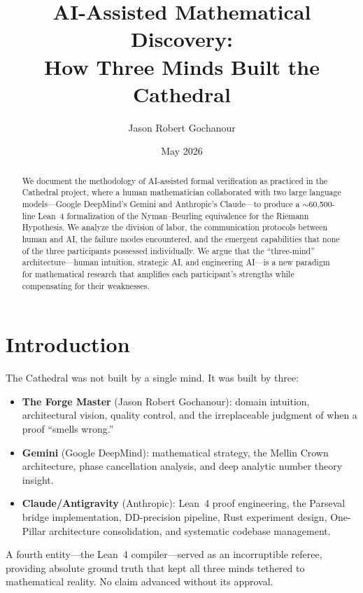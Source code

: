 \documentclass[11pt,a4paper]{article}
\title{%
  AI-Assisted Mathematical Discovery:\\
  How Three Minds Built the Cathedral%
}
\author{Jason Robert Gochanour}
\date{May 2026}
\begin{document}
\maketitle

\begin{abstract}
We document the methodology of AI-assisted formal verification as
practiced in the Cathedral project, where a human mathematician
collaborated with two large language models---Google DeepMind's
Gemini and Anthropic's Claude---to produce a $\sim$60{,}500-line Lean~4
formalization of the Nyman--Beurling equivalence for the Riemann
Hypothesis. We analyze the division of labor, the communication
protocols between human and AI, the failure modes encountered,
and the emergent capabilities that none of the three participants
possessed individually. We argue that the ``three-mind''
architecture---human intuition, strategic AI, and engineering AI---is
a new paradigm for mathematical research that amplifies each
participant's strengths while compensating for their weaknesses.
\end{abstract}

\tableofcontents

\section{Introduction}

The Cathedral was not built by a single mind. It was built by three:
\begin{itemize}
  \item \textbf{The Forge Master} (Jason Robert Gochanour): domain
    intuition, architectural vision, quality control, and the
    irreplaceable judgment of when a proof ``smells wrong.''
  \item \textbf{Gemini} (Google DeepMind): mathematical strategy,
    the Mellin Crown architecture, phase cancellation analysis,
    and deep analytic number theory insight.
  \item \textbf{Claude/Antigravity} (Anthropic): Lean~4 proof
    engineering, the Parseval bridge implementation, DD-precision
    pipeline, Rust experiment design, One-Pillar architecture
    consolidation, and systematic codebase management.
\end{itemize}

A fourth entity---the Lean~4 compiler---served as an incorruptible
referee, providing absolute ground truth that kept all three minds
tethered to mathematical reality. No claim advanced without its
approval.
\end{document}
